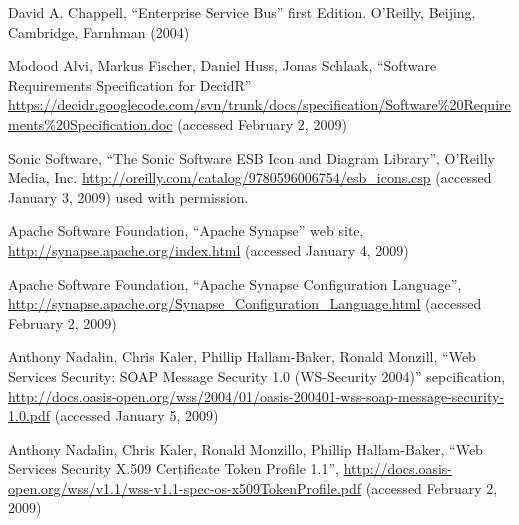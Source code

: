 %
%

\begin{thebibliography}{}

 David A. Chappell,
``Enterprise Service Bus'' first Edition. 
O'Reilly, Beijing, Cambridge, Farnhman (2004)

 Modood Alvi, Markus Fischer, Daniel Huss, Jonas
Schlaak,
``Software Requirements Specification for DecidR''
\url{https://decidr.googlecode.com/svn/trunk/docs/specification/Software%20Requirements%20Specification.doc}
(accessed
February 2, 2009)

Sonic Software,
``The Sonic Software ESB Icon and Diagram Library'',
O'Reilly Media, Inc.
\url{http://oreilly.com/catalog/9780596006754/esb_icons.csp} (accessed January
3, 2009)
used with permission.

Apache Software Foundation, 
``Apache Synapse'' web site,
\url{http://synapse.apache.org/index.html} (accessed January 4, 2009)

Apache Software Foundation,
``Apache Synapse Configuration Language'',
\url{http://synapse.apache.org/Synapse_Configuration_Language.html} (accessed
February 2, 2009)

Anthony Nadalin, Chris Kaler, Phillip Hallam-Baker, Ronald Monzill,
``Web Services Security: SOAP Message Security 1.0 (WS-Security 2004)''
sepcification,
\url{http://docs.oasis-open.org/wss/2004/01/oasis-200401-wss-soap-message-security-1.0.pdf}
(accessed January 5, 2009)

Anthony Nadalin, Chris Kaler, Ronald Monzillo, Phillip Hallam-Baker,
``Web Services Security X.509 Certificate Token Profile 1.1'',
\url{http://docs.oasis-open.org/wss/v1.1/wss-v1.1-spec-os-x509TokenProfile.pdf}
(accessed February 2, 2009)

\end{thebibliography}

